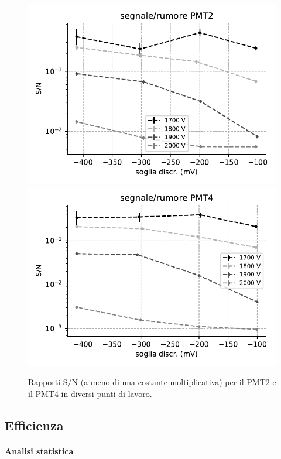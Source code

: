 \documentclass[a4paper]{article}
\begin{document}
\begin{figure}[h]
\centering
\includegraphics[width=8 cm]{calib_pmt2}
\includegraphics[width=8 cm]{calib_pmt4}
\caption{Rapporti S/N (a meno di una costante moltiplicativa) per il PMT2 e il PMT4 in diversi punti di lavoro.}
\label{test2}
\end{figure}

\subsection*{Efficienza}

\paragraph{Analisi statistica}
\end{document}

